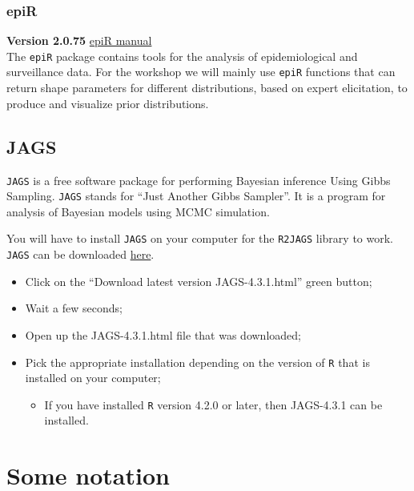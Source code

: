 \documentclass[
]{book}
\providecommand{\tightlist}{%
  \setlength{\itemsep}{0pt}\setlength{\parskip}{0pt}}
\begin{document}
\subsubsection{epiR}\label{epir}

\textbf{Version 2.0.75} \href{https://cran.r-project.org/web/packages/epiR/epiR.pdf}{epiR manual}\\
The \texttt{epiR} package contains tools for the analysis of epidemiological and surveillance data. For the workshop we will mainly use \texttt{epiR} functions that can return shape parameters for different distributions, based on expert elicitation, to produce and visualize prior distributions.

\subsection{JAGS}\label{jags}

\texttt{JAGS} is a free software package for performing Bayesian inference Using Gibbs Sampling. \texttt{JAGS} stands for ``Just Another Gibbs Sampler''. It is a program for analysis of Bayesian models using MCMC simulation.

You will have to install \texttt{JAGS} on your computer for the \texttt{R2JAGS} library to work. \texttt{JAGS} can be downloaded \href{https://sourceforge.net/projects/mcmc-jags/files/}{here}.

\begin{itemize}
\tightlist
\item
  Click on the ``Download latest version JAGS-4.3.1.html'' green button;\\
\item
  Wait a few seconds;\\
\item
  Open up the JAGS-4.3.1.html file that was downloaded;\\
\item
  Pick the appropriate installation depending on the version of \texttt{R} that is installed on your computer;

  \begin{itemize}
  \tightlist
  \item
    If you have installed \texttt{R} version 4.2.0 or later, then JAGS-4.3.1 can be installed.
  \end{itemize}
\end{itemize}

\section{Some notation}\label{some-notation}
\end{document}
